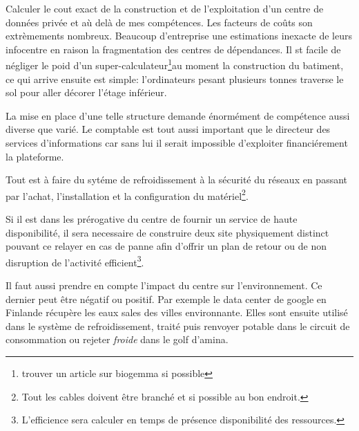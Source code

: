 \documentclass[11pt, a4paper ]{article}
\begin{document}
\begin{spacing}{1.5}

Calculer le cout exact de la construction et de l'exploitation d'un centre de données privée et aù delà de mes compétences. Les facteurs de coûts son extrèmements nombreux. Beaucoup d'entreprise une estimations inexacte de leurs infocentre en raison la fragmentation des centres de dépendances. Il st facile de négliger le poid d'un super-calculateur\footnote{trouver un article sur biogemma si possible}au moment la construction du batiment, ce qui arrive ensuite est simple: l'ordinateurs pesant plusieurs tonnes traverse le sol pour aller décorer l'étage inférieur.

La mise en place d'une telle structure demande énormément de compétence aussi diverse que varié. Le comptable est tout aussi important que le directeur des services d'informations car sans lui il serait impossible d'exploiter financiérement la plateforme. 

Tout est à faire du sytéme de refroidissement à la sécurité du réseaux en passant par l'achat, l'installation et la configuration du matériel\footnote{Tout les cables doivent être branché et si possible au bon endroit.}. 

Si il est dans les prérogative du centre de fournir un service de haute disponibilité, il sera necessaire de construire deux site physiquement distinct pouvant ce relayer en cas de panne afin d'offrir un plan de retour ou de non disruption de l'activité efficient\footnote{L'efficience sera calculer en temps de présence disponibilité des ressources.}. 

Il faut aussi prendre en compte l'impact du centre sur l'environnement. Ce dernier peut être négatif ou positif. Par exemple le data center de google en Finlande récupère les eaux sales des villes environnante. Elles sont ensuite utilisé dans le système de refroidissement, traité puis renvoyer potable dans le circuit de consommation ou rejeter \emph{froide} dans le golf d'amina.


\end{spacing}
\end{document}
